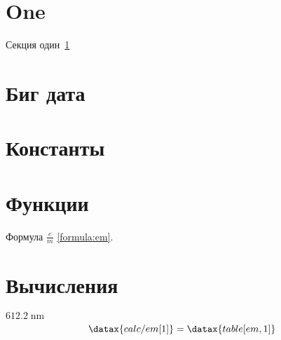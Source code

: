 \documentclass[
    oneside, %
    draft, %
    12pt %
]{article}
\begin{document}


\maketitleguapsimple

\section{One} \label{section:one}


Секция один~\ref{section:one}




\section{Биг дата}




\section{Константы}


\section{Функции}


Формула $\frac{e}{m}$ \eqref{formula:em}.

\section{Вычисления}
$612.2\;\mathrm{nm}$
\[
\datax{calc/em[1]} = \datax{table[em,1]} 
\]
\end{document}
